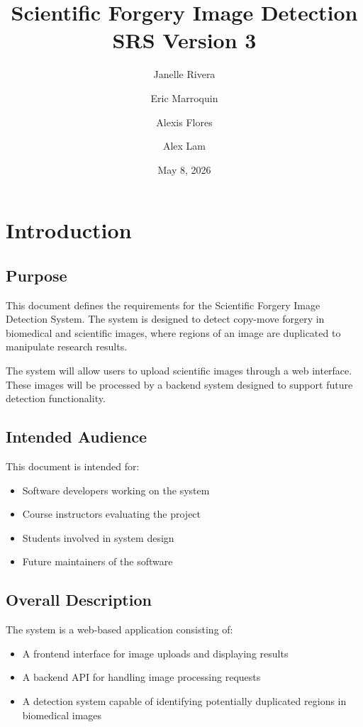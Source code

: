 \documentclass[12pt]{article}
\title{Scientific Forgery Image Detection\\SRS Version 3}
\author{Janelle Rivera \and Eric Marroquin \and Alexis Flores \and Alex Lam}
\date{May 8, 2026}
\begin{document}
\maketitle

\tableofcontents
\newpage

\section{Introduction}

\subsection{Purpose}

This document defines the requirements for the Scientific Forgery Image Detection
System. The system is designed to detect copy-move forgery in biomedical and
scientific images, where regions of an image are duplicated to manipulate research
results.

The system will allow users to upload scientific images through a web interface. These
images will be processed by a backend system designed to support future detection
functionality.

\subsection{Intended Audience}

This document is intended for:

\begin{itemize}
    \item Software developers working on the system
    \item Course instructors evaluating the project
    \item Students involved in system design
    \item Future maintainers of the software
\end{itemize}

\subsection{Overall Description}

The system is a web-based application consisting of:

\begin{itemize}
    \item A frontend interface for image uploads and displaying results
    \item A backend API for handling image processing requests
    \item A detection system capable of identifying potentially duplicated regions in biomedical images
\end{itemize}
\end{document}
